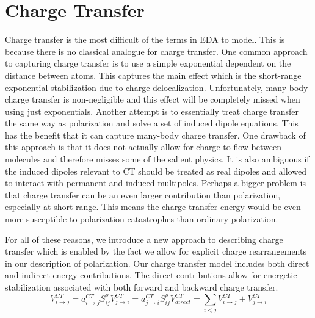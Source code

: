 \documentclass[journal=jacsat,manuscript=article]{achemso}
\begin{document}
\section*{Charge Transfer}
Charge transfer is the most difficult of the terms in EDA to model. This is
because there is no classical analogue for charge transfer. One common approach to
capturing charge transfer is to use a simple exponential dependent on the distance
between atoms.\cite{rackers2021polarizable} This captures the main effect which is the
short-range exponential stabilization due to charge delocalization. Unfortunately,
many-body charge transfer is non-negligible and this effect will be completely
missed when using just exponentials. Another attempt is to essentially treat
charge transfer the same way as polarization and solve a set of induced dipole equations.\cite{das2019development,wang2023general}
This has the benefit that it can capture many-body charge transfer. One drawback of this
approach is that it does not actually allow for charge to flow between molecules
and therefore misses some of the salient physics. It is also ambiguous if the induced
dipoles relevant to CT should be treated as real dipoles and allowed to interact 
with permanent and induced multipoles. Perhaps a bigger problem is that
charge transfer can be an even larger contribution than polarization, especially at short range.
This means the charge transfer energy would be even more susceptible to
polarization catastrophes than ordinary polarization.

For all of these reasons, we introduce a new approach to describing charge transfer
which is enabled by the fact we allow for explicit charge rearrangements in our
description of polarization. Our charge transfer model includes both direct and
indirect energy contributions. The direct contributions allow for energetic stabilization
associated with both forward and backward charge transfer.
\begin{subequations}
  \begin{equation}
  V^{CT}_{i\rightarrow j}=a_{i\rightarrow j}^{CT}S_{ij}^\rho
\end{equation}
\begin{equation}
  V^{CT}_{j\rightarrow i}=a_{j\rightarrow i}^{CT}S_{ij}^\rho
\end{equation}
\begin{equation}
  V^{CT}_{direct}=\sum_{i<j}V^{CT}_{i\rightarrow j}+V^{CT}_{j\rightarrow i}
\end{equation}
  \label{eq:ct_direct}
\end{subequations}
\end{document}
